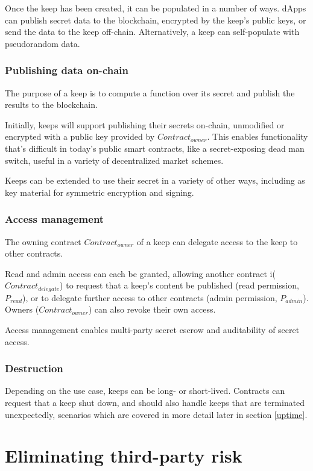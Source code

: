 \documentclass[11pt]{article}
\begin{document}
Once the keep has been created, it can be populated in a number of
ways. dApps can publish secret data to the blockchain, encrypted by
the keep's public keys, or send the data to the keep off-chain.
Alternatively, a keep can self-populate with pseudorandom data.

\subsubsection{Publishing data on-chain}

The purpose of a keep is to compute a function over its secret and
publish the results to the blockchain.

Initially, keeps will support publishing their secrets on-chain,
unmodified or encrypted with a public key provided by
$Contract_{owner}$. This enables functionality that's difficult in
today's public smart contracts, like a secret-exposing dead man
switch, useful in a variety of decentralized market schemes.

Keeps can be extended to use their secret in a variety of other ways,
including as key material for symmetric encryption and signing.

\subsubsection{Access management}

The owning contract $Contract_{owner}$ of a keep can delegate access
to the keep to other contracts.

Read and admin access can each be granted, allowing another
contract i($Contract_{delegate}$) to request that a keep's content be
published (read permission, $P_{read}$), or to delegate further access
to other contracts (admin permission, $P_{admin}$). Owners
($Contract_{owner}$) can also revoke their own access.

Access management enables multi-party secret escrow and auditability
of secret access.

\subsubsection{Destruction}

Depending on the use case, keeps can be long- or short-lived.
Contracts can request that a keep shut down, and should also handle
keeps that are terminated unexpectedly, scenarios which are covered in more
detail later in section \ref{uptime}.

\section{Eliminating third-party risk} \label{eliminatingRisk}
\end{document}
